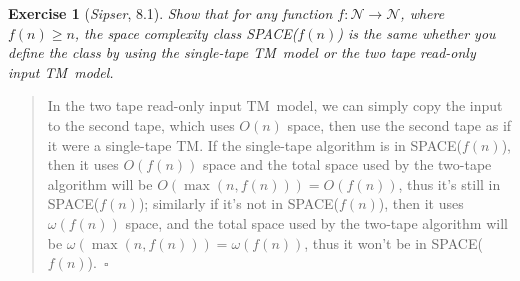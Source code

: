 \documentclass{article}
\theoremstyle{break}			%
\newtheorem{exercise}{Exercise}
\theoremstyle{plain}
\newenvironment{answer}{\begin{quotation}\noindent}{\end{quotation}}
\newcommand{\sipser}{\textit{Sipser}}
\renewcommand{\qed}{~\ensuremath{\square}}
\newcommand{\Nat}{\ensuremath{\mathcal{N}}}
\newcommand{\TM}{\textsf{TM}}
\begin{document}
\begin{exercise}[\sipser, 8.1]\label{tape}
Show that for any function $f:\Nat\to\Nat$, where $f(n)\geq n$, the
space complexity class SPACE($f(n)$) is the same whether you define
the class by using the single-tape \TM\ model or the two tape read-only
input \TM\ model.
\end{exercise}
\begin{answer}
In the two tape read-only input \TM\ model, we can simply copy the
input to the second tape, which uses $O(n)$ space, then use the second
tape as if it were a single-tape \TM.  If the single-tape algorithm is
in SPACE($f(n)$), then it uses $O(f(n))$ space and the total space
used by the two-tape algorithm will be $O(\max(n, f(n)))=O(f(n))$,
thus it's still in SPACE($f(n)$); similarly if it's not in
SPACE($f(n)$), then it uses $\omega(f(n))$ space, and the total space
used by the two-tape algorithm will be
$\omega(\max(n,f(n)))=\omega(f(n))$, thus it won't be in
SPACE($f(n)$).\qed
\end{answer}
\end{document}
